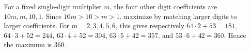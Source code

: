 For a fixed single-digit multiplier $m$, the four other digit coefficients are $10m,m,10,1$. Since $10m>10>m>1$, maximize by matching larger digits to larger coefficients. For $m=2,3,4,5,6$, this gives respectively $64\cdot2+53=181$, $64\cdot3+52=244$, $63\cdot4+52=304$, $63\cdot5+42=357$, and $53\cdot6+42=360$. Hence the maximum is $\boxed{360}$.
